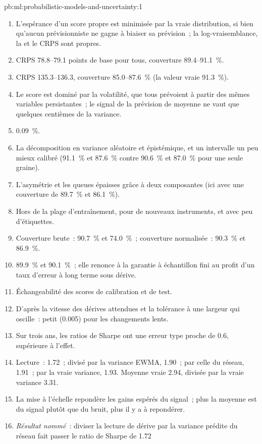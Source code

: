 \begin{solution}{pb:ml:probabilistic-models-and-uncertainty:1}
\begin{enumerate}
\item L'espérance d'un score propre est minimisée par la vraie distribution, si bien qu'aucun prévisionniste ne gagne à biaiser sa prévision~; la
log-vraisemblance, la  et le CRPS sont propres.
\item CRPS 78.8--79.1 points de base pour tous, couverture 89.4--91.1~\%.
\item CRPS 135.3--136.3, couverture 85.0--87.6~\% (la valeur vraie 91.3~\%).
\item Le score est dominé par la volatilité, que tous prévoient à partir des mêmes variables persistantes~; le
signal de la prévision de moyenne ne vaut que quelques centièmes de la variance.
\item 0.09~\%.
\item La décomposition en variance aléatoire et épistémique, et un intervalle un peu mieux calibré (91.1~\% et 87.6~\% contre
90.6~\% et 87.0~\% pour une seule graine).
\item L'asymétrie et les queues épaisses grâce à deux composantes (ici avec une couverture de 89.7~\% et 86.1~\%).
\item Hors de la plage d'entraînement, pour de nouveaux instruments, et avec peu d'étiquettes.
\item Couverture brute~: 90.7~\% et 74.0~\%~; couverture normalisée~: 90.3~\% et 86.9~\%.
\item 89.9~\% et 90.1~\%~; elle renonce à la garantie à échantillon fini au profit d'un taux d'erreur à long terme sous dérive.
\item Échangeabilité des scores de calibration et de test.
\item D'après la vitesse des dérives attendues et la tolérance à une largeur qui oscille~: petit (0.005) pour les changements lents.
\item Sur trois ans, les ratios de Sharpe ont une erreur type proche de 0.6, supérieure à l'effet.
\item Lecture~: 1.72~; divisé par la variance EWMA, 1.90~; par celle du réseau, 1.91~; par la vraie variance, 1.93. Moyenne vraie 2.94, divisée par la vraie
variance 3.31.
\item La mise à l'échelle repondère les gains espérés du signal~; plus la moyenne est du signal plutôt que du bruit, plus il y a
à repondérer.
\item \emph{Résultat nommé}~: diviser la lecture de dérive par la variance prédite du réseau fait passer le ratio de Sharpe de 1.72

\end{enumerate}
\end{solution}
